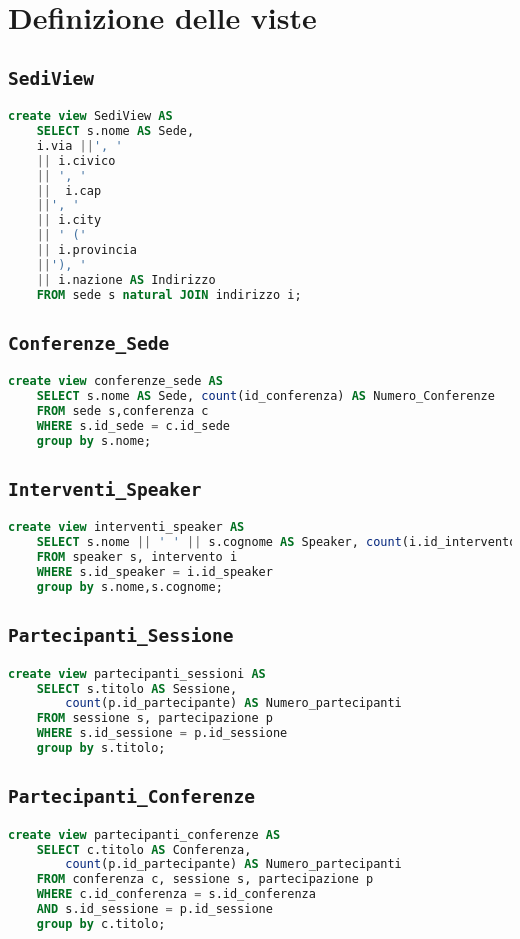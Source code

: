\section{Definizione delle viste}
\subsection{\texttt{SediView}}
\begin{lstlisting}[language=SQL,style=mystyle]
	create view SediView AS 
	SELECT s.nome AS Sede, 
	i.via ||', ' 
	|| i.civico
	|| ', ' 
	||  i.cap 
	||', ' 
	|| i.city 
	|| ' (' 
	|| i.provincia 
	||'), '
	|| i.nazione AS Indirizzo
	FROM sede s natural JOIN indirizzo i;
\end{lstlisting}
\subsection{\texttt{Conferenze\_Sede}}
\begin{lstlisting}[language=SQL,style=mystyle]
	create view conferenze_sede AS
	SELECT s.nome AS Sede, count(id_conferenza) AS Numero_Conferenze
	FROM sede s,conferenza c
	WHERE s.id_sede = c.id_sede
	group by s.nome;
\end{lstlisting}
\subsection{\texttt{Interventi\_Speaker}}
\begin{lstlisting}[language=SQL,style=mystyle]
	create view interventi_speaker AS
	SELECT s.nome || ' ' || s.cognome AS Speaker, count(i.id_intervento)
	FROM speaker s, intervento i 
	WHERE s.id_speaker = i.id_speaker
	group by s.nome,s.cognome;
\end{lstlisting}
\subsection{\texttt{Partecipanti\_Sessione}}
\begin{lstlisting}[language=SQL,style=mystyle]
	create view partecipanti_sessioni AS
	SELECT s.titolo AS Sessione, 
		count(p.id_partecipante) AS Numero_partecipanti
	FROM sessione s, partecipazione p 
	WHERE s.id_sessione = p.id_sessione
	group by s.titolo;
\end{lstlisting}
\subsection{\texttt{Partecipanti\_Conferenze}}
\begin{lstlisting}[language=SQL,style=mystyle]
	create view partecipanti_conferenze AS
	SELECT c.titolo AS Conferenza, 
		count(p.id_partecipante) AS Numero_partecipanti
	FROM conferenza c, sessione s, partecipazione p
	WHERE c.id_conferenza = s.id_conferenza 
	AND s.id_sessione = p.id_sessione
	group by c.titolo;
\end{lstlisting}
